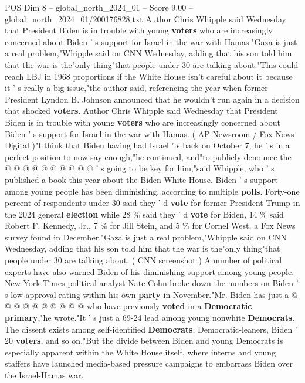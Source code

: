 \begin{textsample}{POS Dim 8 – global\_north\_2024\_01 – Score 9.00 – global\_north\_2024\_01/200176828.txt}  \label{ex:f8_pos_183}
Author Chris Whipple said Wednesday that President Biden is in trouble with young \textbf{voters} who are increasingly concerned about Biden ' s support for Israel in the war with Hamas."Gaza is just a real problem,"Whipple said on CNN Wednesday, adding that his son told him that the war is the"only thing"that people under 30 are talking about."This could reach LBJ in 1968 proportions if the White House isn't careful about it because it ' s really a big issue,"the author said, referencing the year when former President Lyndon B.
Johnson announced that he wouldn't run again in a decision that shocked \textbf{voters}.
Author Chris Whipple said Wednesday that President Biden is in trouble with young \textbf{voters} who are increasingly concerned about Biden ' s support for Israel in the war with Hamas. ( AP Newsroom / Fox News Digital )"I think that Biden having had Israel ' s back on October 7, he ' s in a perfect position to now say enough,"he continued, and"to publicly denounce the @ @ @ @ @ @ @ @ @ @ ' s going to be key for him,"said Whipple, who ' s published a book this year about the Biden White House.
Biden ' s support among young people has been diminishing, according to multiple \textbf{polls}.
Forty-one percent of respondents under 30 said they ' d \textbf{vote} for former President Trump in the 2024 general \textbf{election} while 28 \% said they ' d \textbf{vote} for Biden, 14 \% said Robert F.
Kennedy, Jr., 7 \% for Jill Stein, and 5 \% for Cornel West, a Fox News survey found in December."Gaza is just a real problem,"Whipple said on CNN Wednesday, adding that his son told him that the war is the"only thing"that people under 30 are talking about. ( CNN screenshot ) A number of political experts have also warned Biden of his diminishing support among young people.
New York Times political analyst Nate Cohn broke down the numbers on Biden ' s low approval rating within his own \textbf{party} in November."Mr.
Biden has just a @ @ @ @ @ @ @ @ @ @ who have previously \textbf{voted} in a \textbf{Democratic} \textbf{primary},"he wrote."It ' s just a 69-24 lead among young nonwhite \textbf{Democrats}.
The dissent exists among self-identified \textbf{Democrats}, Democratic-leaners, Biden ' 20 \textbf{voters}, and so on."But the divide between Biden and young Democrats is especially apparent within the White House itself, where interns and young staffers have launched media-based pressure campaigns to embarrass Biden over the Israel-Hamas war.

\end{textsample}

